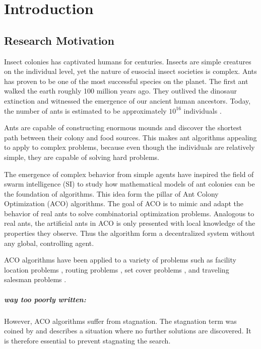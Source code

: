 \graphicspath{{chapters/chapter1/}}
\chapter{Introduction}

\section{Research Motivation}
Insect colonies has captivated humans for centuries. Insects are simple creatures on the individual level, yet the nature of eusocial insect societies is complex. Ants has proven to be one of the most successful species on the planet. The first ant walked the earth roughly 100 million years ago. They outlived the dinosaur extinction and witnessed the emergence of our ancient human ancestors. Today, the number of ants is estimated to be approximately $10^{16}$ individuals \cite{Dorigo2000}. 

Ants are capable of constructing enormous mounds and discover the shortest path between their colony and food sources. This makes ant algorithms appealing to apply to complex problems, because even though the individuals are relatively simple, they are capable of solving hard problems. 

The emergence of complex behavior from simple agents have inspired the field of swarm intelligence (SI) to study how mathematical models of ant colonies can be the foundation of algorithms. This idea form the pillar of Ant Colony Optimization (ACO) algorithms. The goal of ACO is to mimic and adapt the behavior of real ants to solve combinatorial optimization problems. Analogous to real ants, the artificial ants in ACO is only presented with local knowledge of the properties they observe. Thus the algorithm form a decentralized system without any global, controlling agent.

ACO algorithms have been applied to a variety of problems such as facility location problems \cite{Chen2008}, routing problems \cite{Santos2010}, set cover problems \cite{Crawford2006}, and traveling salesman problems \cite{Dorigo1997,Elloumi2014}. 

\paragraph{way too poorly written:} However, ACO algorithms suffer from stagnation. The stagnation term was coined by \textcite{Dorigo1996} and describes a situation where no further solutions are discovered. It is therefore essential to prevent stagnating the search.

